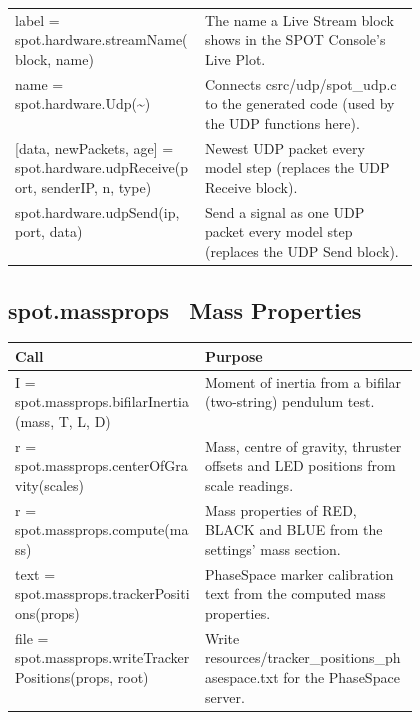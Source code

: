 \documentclass[11pt,a4paper]{article}
\begin{document}
\begin{xltabular}{\linewidth}{@{}>{\raggedright\arraybackslash\ttfamily\footnotesize}p{0.47\linewidth} >{\raggedright\arraybackslash\small}X@{}}
label = spot.hardware.streamName(block, name) & The name a Live Stream block shows in the SPOT Console's Live Plot. \\
name = spot.hardware.Udp(\textasciitilde{}) & Connects csrc/udp/spot\_udp.c to the generated code (used by the UDP functions here). \\
{}[data, newPackets, age] = spot.hardware.udpReceive(port, senderIP, n, type) & Newest UDP packet every model step (replaces the UDP Receive block). \\
spot.hardware.udpSend(ip, port, data) & Send a signal as one UDP packet every model step (replaces the UDP Send block). \\
\bottomrule\end{xltabular}
\subsection*{spot.massprops \textmd{\textendash\ Mass Properties}}
\begin{xltabular}{\linewidth}{@{}>{\raggedright\arraybackslash\ttfamily\footnotesize}p{0.47\linewidth} >{\raggedright\arraybackslash\small}X@{}}
\toprule \normalfont\small\textbf{Call} & \textbf{Purpose} \\ \midrule \endhead
I = spot.massprops.bifilarInertia(mass, T, L, D) & Moment of inertia from a bifilar (two-string) pendulum test. \\
r = spot.massprops.centerOfGravity(scales) & Mass, centre of gravity, thruster offsets and LED positions from scale readings. \\
r = spot.massprops.compute(mass) & Mass properties of RED, BLACK and BLUE from the settings' mass section. \\
text = spot.massprops.trackerPositions(props) & PhaseSpace marker calibration text from the computed mass properties. \\
file = spot.massprops.writeTrackerPositions(props, root) & Write resources/tracker\_positions\_phasespace.txt for the PhaseSpace server. \\
\bottomrule\end{xltabular}
\end{document}
